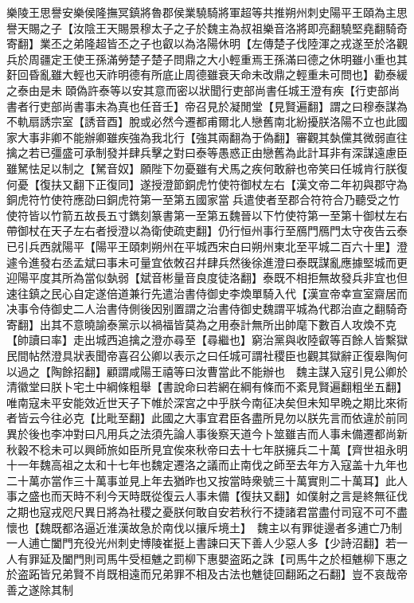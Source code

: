 樂陵王思譽安樂侯隆撫冥鎮將魯郡侯業驍騎將軍超等共推朔州刺史陽平王頤為主思譽天賜之子【汝陰王天賜景穆太子之子於魏主為叔祖樂音洛將即亮翻驍堅堯翻騎奇寄翻】業丕之弟隆超皆丕之子也叡以為洛陽休明【左傳楚子伐陸渾之戎遂至於洛觀兵於周疆定王使王孫滿勞楚子楚子問鼎之大小輕重焉王孫滿曰德之休明雖小重也其姧回昏亂雖大輕也天祚明德有所底止周德雖衰天命未改鼎之輕重未可問也】勸泰緩之泰由是未頤偽許泰等以安其意而密以狀聞行吏部尚書任城王澄有疾【行吏部尚書者行吏部尚書事未為真也任音壬】帝召見於凝閒堂【見賢遍翻】謂之曰穆泰謀為不軌扇誘宗室【誘音酉】脫或必然今遷都甫爾北人戀舊南北紛擾朕洛陽不立也此國家大事非卿不能辦卿雖疾強為我北行【強其兩翻為于偽翻】審觀其埶儻其微弱直往擒之若已彊盛可承制發并肆兵擊之對曰泰等愚惑正由戀舊為此計耳非有深謀遠慮臣雖駑怯足以制之【駑音奴】願陛下勿憂雖有犬馬之疾何敢辭也帝笑曰任城肯行朕復何憂【復扶又翻下正復同】遂授澄節銅虎竹使符御杖左右【漢文帝二年初與郡守為銅虎符竹使符應劭曰銅虎符第一至第五國家當兵遣使者至郡合符符合乃聽受之竹使符皆以竹箭五故長五寸鐫刻篆書第一至第五魏晉以下竹使符第一至第十御杖左右帶御杖在天子左右者授澄以為衛使疏吏翻】仍行恒州事行至鴈門鴈門太守夜告云泰已引兵西就陽平【陽平王頤刺朔州在平城西宋白曰朔州東北至平城二百六十里】澄遽令進發右丞孟斌曰事未可量宜依敇召幷肆兵然後徐進澄曰泰既謀亂應據堅城而更迎陽平度其所為當似埶弱【斌音彬量音良度徒洛翻】泰既不相拒無故發兵非宜也但速往鎮之民心自定遂倍道兼行先遣治書侍御史李煥單騎入代【漢宣帝幸宣室齋居而决事令侍御史二人治書侍側後因别置謂之治書侍御史魏謂平城為代郡治直之翻騎奇寄翻】出其不意曉諭泰黨示以禍福皆莫為之用泰計無所出帥麾下數百人攻煥不克【帥讀曰率】走出城西追擒之澄亦尋至【尋繼也】窮治黨與收陸叡等百餘人皆繫獄民間帖然澄具狀表聞帝喜召公卿以表示之曰任城可謂社稷臣也觀其獄辭正復皋陶何以過之【陶餘招翻】顧謂咸陽王禧等曰汝曹當此不能辦也　魏主謀入寇引見公卿於清徽堂曰朕卜宅土中綱條粗舉【書說命曰若網在綱有條而不紊見賢遍翻粗坐五翻】唯南寇未平安能效近世天子下帷於深宮之中乎朕今南征决矣但未知早晩之期比來術者皆云今往必克【比毗至翻】此國之大事宜君臣各盡所見勿以朕先言而依違於前同異於後也李冲對曰凡用兵之法須先論人事後察天道今卜筮雖吉而人事未備遷都尚新秋穀不稔未可以興師旅如臣所見宜俟來秋帝曰去十七年朕擁兵二十萬【齊世祖永明十一年魏高祖之太和十七年也魏定遷洛之議而止南伐之師至去年方入寇盖十九年也二十萬亦當作三十萬事並見上年去猶昨也又按當時衆號三十萬實則二十萬耳】此人事之盛也而天時不利今天時既從復云人事未備【復扶又翻】如僕射之言是終無征伐之期也寇戎咫尺異日將為社稷之憂朕何敢自安若秋行不捷諸君當盡付司寇不可不盡懷也【魏既都洛逼近淮漢故急於南伐以攘斥境土】　魏主以有罪徙邊者多逋亡乃制一人逋亡闔門充役光州刺史博陵崔挺上書諫曰天下善人少惡人多【少詩沼翻】若一人有罪延及闔門則司馬牛受桓魋之罰柳下惠嬰盗跖之誅【司馬牛之於桓魋柳下惠之於盗跖皆兄弟賢不肖既相遠而兄弟罪不相及古法也魋徒回翻跖之石翻】豈不哀哉帝善之遂除其制

